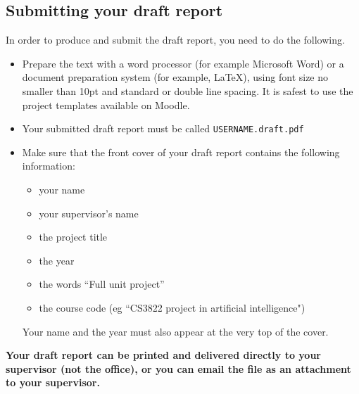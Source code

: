 \documentclass[11pt]{article}
\begin{document}
\subsection{Submitting your draft report}
In order to produce and submit the draft report, you need to do the following.
\begin{itemize}
\item Prepare the text with a word processor (for example Microsoft Word\texttrademark) or a document preparation system (for example,  \LaTeX), using font size no smaller than 10pt and standard or double line spacing.  It is safest to use the project templates available on Moodle.

\item Your submitted draft report must be called  \texttt{USERNAME.draft.pdf}

\item Make sure that the front cover of your draft report contains the following information:
\begin{itemize}
\item your name
\item your supervisor's name
\item the project title
\item the year
\item the words ``Full unit project''
\item the course code  (eg ``CS3822  project in artificial intelligence")
\end{itemize}
Your name and the year must also appear at the very top of the cover.
\end{itemize}

\textbf{Your draft report can be printed and delivered directly to your supervisor (not the office), or you can email the file as an attachment to your supervisor.}
\newpage
\end{document}
